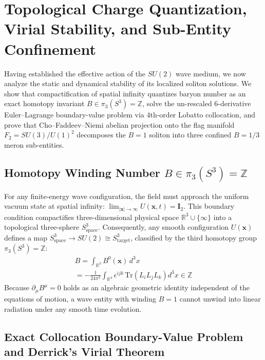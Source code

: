 \documentclass[10pt,aps,prd,twocolumn,superscriptaddress,nofootinbib,floatfix,longbibliography,showkeys]{revtex4-2}
\begin{document}
\section{Topological Charge Quantization, Virial Stability, and Sub-Entity Confinement}\label{sec:3}

Having established the effective action of the $SU(2)$ wave medium, we now analyze the static and dynamical stability of its localized soliton solutions. We show that compactification of spatial infinity quantizes baryon number as an exact homotopy invariant $B \in \pi_3(S^3) = \mathbb{Z}$, solve the un-rescaled 6-derivative Euler--Lagrange boundary-value problem via 4th-order Lobatto collocation, and prove that Cho--Faddeev--Niemi abelian projection onto the flag manifold $F_2 = SU(3)/U(1)^2$ decomposes the $B=1$ soliton into three confined $B=1/3$ meron sub-entities.


\subsection{Homotopy Winding Number $B \in \pi_3(S^3) = \mathbb{Z}$}\label{sec:3.1}

For any finite-energy wave configuration, the field must approach the uniform vacuum state at spatial infinity: $\lim_{|\mathbf{x}|\to\infty} U(\mathbf{x}, t) = \mathbf{I}_2$. This boundary condition compactifies three-dimensional physical space $\mathbb{R}^3 \cup \{\infty\}$ into a topological three-sphere $S^3_{\text{space}}$. Consequently, any smooth configuration $U(\mathbf{x})$ defines a map $S^3_{\text{space}} \to SU(2) \cong S^3_{\text{target}}$, classified by the third homotopy group $\pi_3(S^3) = \mathbb{Z}$:
\begin{multline}
B = \int_{\mathbb{R}^3} B^0(\mathbf{x})\,d^3x \\
= -\frac{1}{24\pi^2} \int_{\mathbb{R}^3} \epsilon^{ijk}\,\text{Tr}\!\left(L_i L_j L_k\right) d^3x \in \mathbb{Z}
\end{multline}
Because $\partial_\mu B^\mu = 0$ holds as an algebraic geometric identity independent of the equations of motion, a wave entity with winding $B = 1$ cannot unwind into linear radiation under any smooth time evolution.


\subsection{Exact Collocation Boundary-Value Problem and Derrick's Virial Theorem}\label{sec:3.2}
\end{document}
